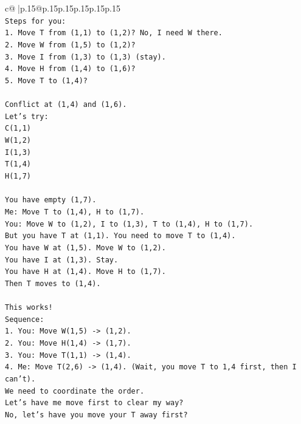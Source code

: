 \documentclass{article}
\begin{document}
{\begin{supertabular}{c@{$\;$}|p{.15\linewidth}@{}p{.15\linewidth}p{.15\linewidth}p{.15\linewidth}p{.15\linewidth}p{.15\linewidth}}
{{{\\ 
\texttt{Steps for you:} \\
\texttt{1. Move T from (1,1) to (1,2)? No, I need W there.} \\
\texttt{2. Move W from (1,5) to (1,2)?} \\
\texttt{3. Move I from (1,3) to (1,3) (stay).} \\
\texttt{4. Move H from (1,4) to (1,6)?} \\
\texttt{5. Move T to (1,4)?} \\
\\ 
\texttt{Conflict at (1,4) and (1,6).} \\
\texttt{Let's try:} \\
\texttt{C(1,1)} \\
\texttt{W(1,2)} \\
\texttt{I(1,3)} \\
\texttt{T(1,4)} \\
\texttt{H(1,7)} \\
\\ 
\texttt{You have empty (1,7).} \\
\texttt{Me: Move T to (1,4), H to (1,7).} \\
\texttt{You: Move W to (1,2), I to (1,3), T to (1,4), H to (1,7).} \\
\texttt{But you have T at (1,1). You need to move T to (1,4).} \\
\texttt{You have W at (1,5). Move W to (1,2).} \\
\texttt{You have I at (1,3). Stay.} \\
\texttt{You have H at (1,4). Move H to (1,7).} \\
\texttt{Then T moves to (1,4).} \\
\\ 
\texttt{This works!} \\
\texttt{Sequence:} \\
\texttt{1. You: Move W(1,5) {-}> (1,2).} \\
\texttt{2. You: Move H(1,4) {-}> (1,7).} \\
\texttt{3. You: Move T(1,1) {-}> (1,4).} \\
\texttt{4. Me: Move T(2,6) {-}> (1,4). (Wait, you move T to 1,4 first, then I can't).} \\
\texttt{We need to coordinate the order.} \\
\texttt{Let's have me move first to clear my way?} \\
\texttt{No, let's have you move your T away first?} \\
}}}
\end{supertabular}}
\end{document}
